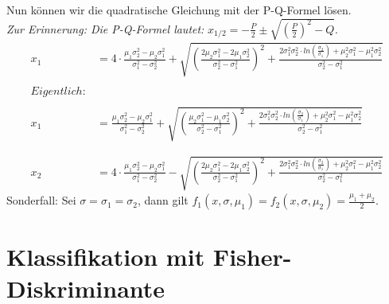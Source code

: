 \documentclass[12pt]{article}
\begin{document}
Nun k\"onnen wir die quadratische Gleichung mit der P-Q-Formel l\"osen.\\
\textit{Zur Erinnerung: Die P-Q-Formel lautet:} $x_{1/2} = -\frac{P}{2} \pm \sqrt{\left(\frac{P}{2}\right)^2 - Q}$.
\begin{align*}
x_1 &= 4 \cdot \frac{\mu_1\sigma_2^2 - \mu_2\sigma_1^2}{\sigma_1^2-\sigma_2^2} + \sqrt{\left( \frac{2\mu_2\sigma_1^2 - 2\mu_1\sigma_2^2}{\sigma_2^2-\sigma_1^2} \right)^2 + \frac{2 \sigma_1^2 \sigma_2^2 \cdot ln \left(\frac{\sigma_2}{\sigma_1}\right) + \mu_2^2\sigma_1^2 - \mu_1^2\sigma_2^2}{\sigma_2^2-\sigma_1^2}}\\
\\
Eigentlich:\\
\\
x_1 &= \frac{\mu_1\sigma_2^2 - \mu_2\sigma_1^2}{\sigma_1^2-\sigma_2^2} + \sqrt{\left( \frac{\mu_2\sigma_1^2 - \mu_1\sigma_2^2}{\sigma_2^2-\sigma_1^2} \right)^2 + \frac{2 \sigma_1^2 \sigma_2^2 \cdot ln \left(\frac{\sigma_2}{\sigma_1}\right) + \mu_2^2\sigma_1^2 - \mu_1^2\sigma_2^2}{\sigma_2^2-\sigma_1^2}}\\
\\
\\
x_2 &= 4 \cdot \frac{\mu_1\sigma_2^2 - \mu_2\sigma_1^2}{\sigma_1^2-\sigma_2^2} - \sqrt{\left( \frac{2\mu_2\sigma_1^2 - 2\mu_1\sigma_2^2}{\sigma_2^2-\sigma_1^2} \right)^2 + \frac{2 \sigma_1^2 \sigma_2^2 \cdot ln \left(\frac{\sigma_2}{\sigma_1}\right) + \mu_2^2\sigma_1^2 - \mu_1^2\sigma_2^2}{\sigma_2^2-\sigma_1^2}}
\end{align*}
Sonderfall: Sei $\sigma = \sigma_1 = \sigma_2$, dann gilt $f_1(x,\sigma,\mu_1) = f_2(x,\sigma,\mu_2) = \frac{\mu_1+\mu_2}{2}$.
\newpage

\section{Klassifikation mit Fisher-Diskriminante}
\begin{lstlisting}[language=Matlab]
\end{lstlisting}
\newpage
\end{document}
